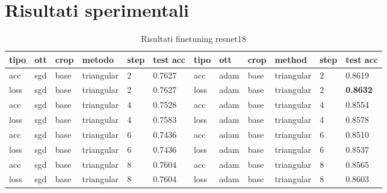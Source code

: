 


\newpage
\appendix
\section{Risultati sperimentali}
\begin{table}[H]
\centering
\caption{Risultati finetuning resnet18}
\begin{adjustbox}{width=1\textwidth}
\begin{tabular}{|l|l|l|l|l|l||l|l|l|l|l|l|}
\hline
\textbf{tipo} & \textbf{ott} & \textbf{crop} & \textbf{metodo} & \textbf{step} & \textbf{test acc} & \textbf{tipo} & \textbf{ott} & \textbf{crop} & \textbf{method} & \textbf{step} & \textbf{test acc} \\ \hline
acc           & sgd          & base          & triangular      & 2             & 0.7627            & acc           & adam         & base          & triangular      & 2             & 0.8619   \\ \hline
loss          & sgd          & base          & triangular      & 2             & 0.7627            & loss          & adam         & base          & triangular      & 2             & \textbf{0.8632}            \\ \hline
acc           & sgd          & base          & triangular      & 4             & 0.7528            & acc           & adam         & base          & triangular      & 4             & 0.8554            \\ \hline
loss          & sgd          & base          & triangular      & 4             & 0.7583            & loss          & adam         & base          & triangular      & 4             & 0.8578            \\ \hline
acc           & sgd          & base          & triangular      & 6             & 0.7436            & acc           & adam         & base          & triangular      & 6             & 0.8510            \\ \hline
loss          & sgd          & base          & triangular      & 6             & 0.7436            & loss          & adam         & base          & triangular      & 6             & 0.8537            \\ \hline
acc           & sgd          & base          & triangular      & 8             & 0.7604            & acc           & adam         & base          & triangular      & 8             & 0.8565            \\ \hline
loss          & sgd          & base          & triangular      & 8             & 0.7604            & loss          & adam         & base          & triangular      & 8             & 0.8603            \\ \hline

\end{tabular}
\end{adjustbox}
\end{table}
